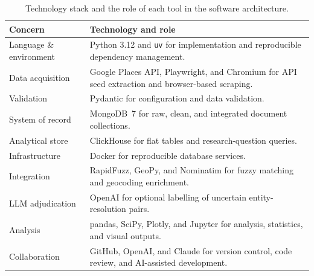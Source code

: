 \begin{table}[H]
\centering
\scriptsize
\setlength{\tabcolsep}{3pt}
\renewcommand{\arraystretch}{1.14}
\begin{tabularx}{\columnwidth}{@{}>{\RaggedRight\arraybackslash}p{}X@{}}
\toprule
\textbf{Concern} & \textbf{Technology and role} \\
\midrule
Language \& environment & Python 3.12 and \texttt{uv} for implementation and reproducible dependency management. \\
Data acquisition & Google Places API, Playwright, and Chromium for API seed extraction and browser-based scraping. \\
Validation & Pydantic for configuration and data validation. \\
System of record & MongoDB~7 for raw, clean, and integrated document collections. \\
Analytical store & ClickHouse for flat tables and research-question queries. \\
Infrastructure & Docker for reproducible database services. \\
Integration & RapidFuzz, GeoPy, and Nominatim for fuzzy matching and geocoding enrichment. \\
LLM adjudication & OpenAI for optional labelling of uncertain entity-resolution pairs. \\
Analysis & pandas, SciPy, Plotly, and Jupyter for analysis, statistics, and visual outputs. \\
Collaboration & GitHub, OpenAI, and Claude for version control, code review, and AI-assisted development. \\
\bottomrule
\end{tabularx}
\captionsetup{font=small}
\caption{Technology stack and the role of each tool in the software architecture.}
\label{tab:tech_stack}
\end{table}
